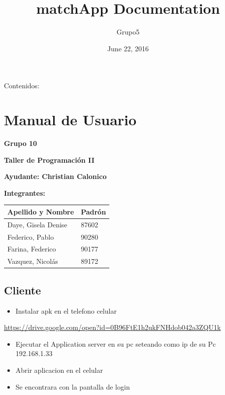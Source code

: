 \documentclass[letterpaper,10pt,english]{sphinxmanual}
\title{matchApp Documentation}
\date{June 22, 2016}
\author{Grupo5}
\begin{document}
\maketitle
\tableofcontents
{}\label{index::doc}


Contenidos:


\chapter{Manual de Usuario}
\label{manuals:manual-de-usuario}\label{manuals::doc}\label{manuals:documentacion-de-matchapp}
\textbf{Grupo 10}

\textbf{Taller de Programación II}

\textbf{Ayudante: Christian Calonico}

\textbf{Integrantes:}

\begin{tabulary}{\linewidth}{|L|L|}
\hline
\textsf{\relax 
Apellido y Nombre
} & \textsf{\relax 
Padrón
}\\
\hline
Daye, Gisela Denise
 & 
87602
\\
\hline
Federico, Pablo
 & 
90280
\\
\hline
Farina, Federico
 & 
90177
\\
\hline
Vazquez, Nicolás
 & 
89172
\\
\hline\end{tabulary}



\section{Cliente}
\label{manuals:cliente}\begin{itemize}
\item {} 
Instalar apk en el telefono celular

\end{itemize}

\href{https://drive.google.com/open?id=0B96FtE1h2ukFNHdob042a3ZQU1k}{https://drive.google.com/open?id=0B96FtE1h2ukFNHdob042a3ZQU1k}
\begin{itemize}
\item {} 
Ejecutar el Application server en su pc seteando como ip de su Pc 192.168.1.33

\item {} 
Abrir aplicacion en el celular

\item {} 
Se encontrara con la pantalla de login

\end{itemize}
\end{document}
